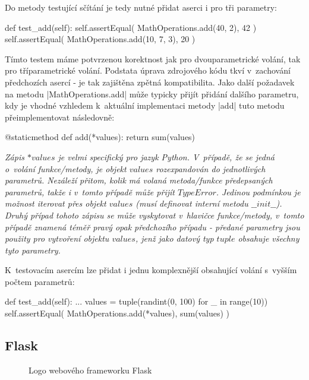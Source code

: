 Do metody testující sčítání je tedy nutné přidat aserci i pro tři parametry:

\begin{code}[caption={Testovací metoda pro vylepšenou $MathOperations.add$}]
def test_add(self):
	self.assertEqual(
		MathOperations.add(40, 2),
		42
	)
	self.assertEqual(
		MathOperations.add(10, 7, 3),
		20
	)
\end{code}

\begin{sloppypar}
	Tímto testem máme potvrzenou korektnost jak pro dvouparametrické volání, tak pro  tříparametrické volání. Podstata úprava zdrojového kódu tkví v~zachování předchozích asercí - je tak zajištěna zpětná kompatibilita. Jako další požadavek na metodu \ic|MathOperations.add| může typicky přijít přidání dalšího parametru, kdy je vhodné vzhledem k~aktuální implementaci metody \ic|add| tuto metodu přeimplementovat následovně:
\end{sloppypar}

\begin{code}[caption={Finální implementace metody $MathOperations.add$}]
@staticmethod
def add(*values):
	return sum(values)
\end{code}

\textit{
  Zápis $*values$ je velmi specifický pro jazyk Python. V~případě, že se jedná o~volání funkce/metody, je objekt $values$ rozexpandován do jednotlivých parametrů. Nezáleží přitom, kolik má volaná metoda/funkce předepsaných parametrů, takže i v~tomto případě může přijít $TypeError$. Jedinou podmínkou je možnost iterovat přes objekt $values$ (musí definovat interní metodu $\_\_init\_\_$). \\Druhý případ tohoto zápisu se může vyskytovat v~hlavičce funkce/metody, v~tomto případě znamená téměř pravý opak předchozího případu - předané parametry jsou použity pro vytvoření objektu $values$, jenž jako datový typ $tuple$ obsahuje všechny tyto parametry. 
}

K~testovacím asercím lze přidat i jednu komplexnější obsahující volání s~vyšším počtem parametrů:

\begin{code}[caption={Finální test pro metodu $MathOperations.add$}]
def test_add(self):
	...
	values = tuple(randint(0, 100) for _ in range(10))
	self.assertEqual(
		MathOperations.add(*values),
		sum(values)
	)

\end{code}

\subsection{Flask}
\label{subsec:flask}
\begin{wrapfigure}[18]{L}{.35\textwidth}
    \centering
    
    \caption{Logo webového frameworku Flask}
\end{wrapfigure}

